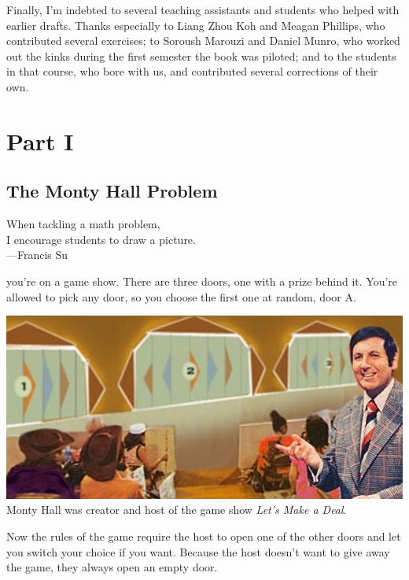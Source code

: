 \documentclass[justified]{tufte-book}
\newenvironment{epigraph}%
{
\begin{flushright}    
\begin{minipage}{20em}
\begin{flushright}
\itshape
}%
{
\end{flushright}
\end{minipage}
\end{flushright}
}
\theoremstyle{definition}
\theoremstyle{definition}
\theoremstyle{definition}
\theoremstyle{definition}
\theoremstyle{remark}
\begin{document}
Finally, I'm indebted to several teaching assistants and students who helped with earlier drafts. Thanks especially to Liang Zhou Koh and Meagan Phillips, who contributed several exercises; to Soroush Marouzi and Daniel Munro, who worked out the kinks during the first semester the book was piloted; and to the students in that course, who bore with us, and contributed several corrections of their own.

\hypertarget{part-part-i}{%
\part*{Part I}\label{part-part-i}}

\hypertarget{the-monty-hall-problem}{%
\chapter{The Monty Hall Problem}\label{the-monty-hall-problem}}

\begin{epigraph}
When tackling a math problem,\\
I encourage students to draw a picture.\\
---Francis Su
\end{epigraph}

 you're on a game show. There are three doors, one with a prize behind it. You're allowed to pick any door, so you choose the first one at random, door A.

\begin{marginfigure}
\includegraphics{img/lets_make_a_deal.png} Monty Hall was creator and
host of the game show \emph{Let's Make a Deal}.
\end{marginfigure}

Now the rules of the game require the host to open one of the other doors and let you switch your choice if you want. Because the host doesn't want to give away the game, they always open an empty door.
\end{document}
